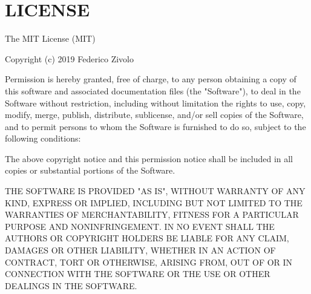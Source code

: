 \chapter{LICENSE}
\hypertarget{md__tele-website_2node__modules_2_0dpopperjs_2core_2_l_i_c_e_n_s_e}{}\label{md__tele-website_2node__modules_2_0dpopperjs_2core_2_l_i_c_e_n_s_e}
The MIT License (MIT)

Copyright (c) 2019 Federico Zivolo

Permission is hereby granted, free of charge, to any person obtaining a copy of this software and associated documentation files (the "{}\+Software"{}), to deal in the Software without restriction, including without limitation the rights to use, copy, modify, merge, publish, distribute, sublicense, and/or sell copies of the Software, and to permit persons to whom the Software is furnished to do so, subject to the following conditions\+:

The above copyright notice and this permission notice shall be included in all copies or substantial portions of the Software.

THE SOFTWARE IS PROVIDED "{}\+AS IS"{}, WITHOUT WARRANTY OF ANY KIND, EXPRESS OR IMPLIED, INCLUDING BUT NOT LIMITED TO THE WARRANTIES OF MERCHANTABILITY, FITNESS FOR A PARTICULAR PURPOSE AND NONINFRINGEMENT. IN NO EVENT SHALL THE AUTHORS OR COPYRIGHT HOLDERS BE LIABLE FOR ANY CLAIM, DAMAGES OR OTHER LIABILITY, WHETHER IN AN ACTION OF CONTRACT, TORT OR OTHERWISE, ARISING FROM, OUT OF OR IN CONNECTION WITH THE SOFTWARE OR THE USE OR OTHER DEALINGS IN THE SOFTWARE. 